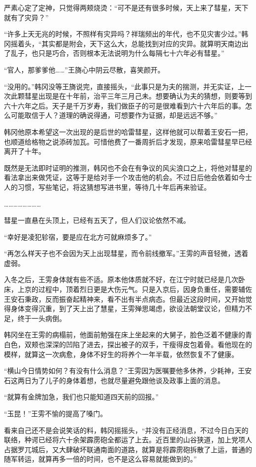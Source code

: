 严素心定了定神，只觉得两颊烧烫：“可不是还有很多时候，天上来了彗星，天下就有了灾异？”

“许多上天无兆的时候，不照样有灾异吗？祥瑞频出的年代，也不见灾害少过。”韩冈摇着头，“其实都是附会，天下这么大，总能找到对应的灾异。就算明天南边出了乱子，也只是巧合，否则根本无法说明为什么每隔七十六年必有彗星。”

“官人，那爹爹他……”王旖心中阴云尽散，喜笑颜开。

“没用的。”韩冈没等王旖说完，直接摇头，“此事只是为夫的揣测，并无实证，上一次此颗彗星出现是在十年前，治平三年三月己未。想要确认为夫的猜想，则要等到六十六年之后。天子是千万岁寿，我们做臣子的可是很难看到六十六年后的事。怎么可能取信于人？道理的确说得通，可想要作为证据，却是远远不够。”

韩冈他原本希望这一次出现的是后世的哈雷彗星，这样他就可以帮着王安石一把，也顺道给格物之说添砖加瓦。可惜他费了一番周折后才发现，原来哈雷彗星早已经离开了十年。

既然是无法即时证明的推测，韩冈也不会在有争议的风尖浪口之上，将他对彗星的看法拿出来做凭证，这等于是给对手一个攻击他的机会。不过日后他会依着如今士人的习惯，写些笔记，将这猜想写进书里，等待几十年后再来验证。

……………………

彗星一直悬在头顶上，已经有五天了，但人们议论依然不减。

“幸好是凌犯轸宿，要是应在北方可就麻烦多了。”

“再怎么样天子也不会因为天上出现彗星，而令前线撤军。”王雱的声音轻微，透着虚弱。

入冬之后，王雱身体就有些不适。原本他体质就不好，在江宁时就已经是几次卧床，上京的过程中，顶着烈日更是大伤元气。只是入京后，因身负重任，需要辅佐王安石秉政，反而振奋起精神来，看不出有半点病态。但最近这段时间，又开始觉得身体变得沉重，到了天上出了慧星，王雱殚思竭虑，欲设法朝堂议论，但精力不足，终于一头病倒。

韩冈坐在王雱的病榻前，他面前勉强在床上坐起来的大舅子，脸色泛着不健康的青白色，双颊也深深的凹陷了进去，探出被子的双手，干瘦得皮包着骨。看他现在的模样，就算这一次病愈，身体不好生的将养个一年半载，依然恢复不了健康。

“横山今日情势如何？有没有什么消息？”王雱因为医嘱要他多休养，少耗神，王安石这两日为了儿子的身体着想，也就尽量避免跟他谈及政事上面的消息。

“就算有金牌加急，我们也只能知道四天前的回报。”

“玉昆！”王雱不愉的提高了嗓门。

看来自己还不是会说笑话的料，韩冈摇摇头，“并没有正经消息，不过今日白天的联络，种谔已经将六十余架霹雳砲全都运了上去。近百里的山谷狭道，加上党项人占据罗兀城后，又大肆破坏联通南面的道路，就算是将霹雳砲拆散了上运，普通的随军转运，就算再多一倍的时间，也不是这么容易就能做到的。”

